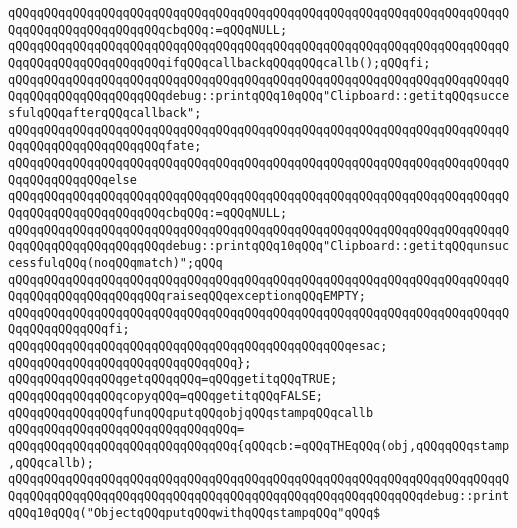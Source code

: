 \verb|qQQqqQQqqQQqqQQqqQQqqQQqqQQqqQQqqQQqqQQqqQQqqQQqqQQqqQQqqQQqqQQqqQQqqQQqqQQqqQQqqQQqqQQqqQQqcbqQQq:=qQQqNULL;|\newline
\verb|qQQqqQQqqQQqqQQqqQQqqQQqqQQqqQQqqQQqqQQqqQQqqQQqqQQqqQQqqQQqqQQqqQQqqQQqqQQqqQQqqQQqqQQqqQQqifqQQqcallbackqQQqqQQqcallb();qQQqfi;|\newline
\verb|qQQqqQQqqQQqqQQqqQQqqQQqqQQqqQQqqQQqqQQqqQQqqQQqqQQqqQQqqQQqqQQqqQQqqQQqqQQqqQQqqQQqqQQqqQQqdebug::printqQQq10qQQq"Clipboard::getitqQQqsuccesfulqQQqafterqQQqcallback";|\newline
\verb|qQQqqQQqqQQqqQQqqQQqqQQqqQQqqQQqqQQqqQQqqQQqqQQqqQQqqQQqqQQqqQQqqQQqqQQqqQQqqQQqqQQqqQQqqQQqfate;|\newline
\verb|qQQqqQQqqQQqqQQqqQQqqQQqqQQqqQQqqQQqqQQqqQQqqQQqqQQqqQQqqQQqqQQqqQQqqQQqqQQqqQQqqQQqelse|\newline
\verb|qQQqqQQqqQQqqQQqqQQqqQQqqQQqqQQqqQQqqQQqqQQqqQQqqQQqqQQqqQQqqQQqqQQqqQQqqQQqqQQqqQQqqQQqqQQqcbqQQq:=qQQqNULL;|\newline
\verb|qQQqqQQqqQQqqQQqqQQqqQQqqQQqqQQqqQQqqQQqqQQqqQQqqQQqqQQqqQQqqQQqqQQqqQQqqQQqqQQqqQQqqQQqqQQqdebug::printqQQq10qQQq"Clipboard::getitqQQqunsuccessfulqQQq(noqQQqmatch)";qQQq|\newline
\verb|qQQqqQQqqQQqqQQqqQQqqQQqqQQqqQQqqQQqqQQqqQQqqQQqqQQqqQQqqQQqqQQqqQQqqQQqqQQqqQQqqQQqqQQqqQQqraiseqQQqexceptionqQQqEMPTY;|\newline
\verb|qQQqqQQqqQQqqQQqqQQqqQQqqQQqqQQqqQQqqQQqqQQqqQQqqQQqqQQqqQQqqQQqqQQqqQQqqQQqqQQqqQQqfi;|\newline
\verb|qQQqqQQqqQQqqQQqqQQqqQQqqQQqqQQqqQQqqQQqqQQqqQQqesac;|\newline
\verb|qQQqqQQqqQQqqQQqqQQqqQQqqQQqqQQq};|\newline
\newline
\verb|qQQqqQQqqQQqqQQqgetqQQqqQQq=qQQqgetitqQQqTRUE;|\newline
\verb|qQQqqQQqqQQqqQQqcopyqQQq=qQQqgetitqQQqFALSE;|\newline
\newline
\verb|qQQqqQQqqQQqqQQqfunqQQqputqQQqobjqQQqstampqQQqcallb|\newline
\verb|qQQqqQQqqQQqqQQqqQQqqQQqqQQqqQQq=|\newline
\verb|qQQqqQQqqQQqqQQqqQQqqQQqqQQqqQQq{qQQqcb:=qQQqTHEqQQq(obj,qQQqqQQqstamp,qQQqcallb);|\newline
\verb|qQQqqQQqqQQqqQQqqQQqqQQqqQQqqQQqqQQqqQQqqQQqqQQqqQQqqQQqqQQqqQQqqQQqqQQqqQQqqQQqqQQqqQQqqQQqqQQqqQQqqQQqqQQqqQQqqQQqqQQqqQQqqQQqdebug::printqQQq10qQQq("ObjectqQQqputqQQqwithqQQqstampqQQq"qQQq$|\newline
